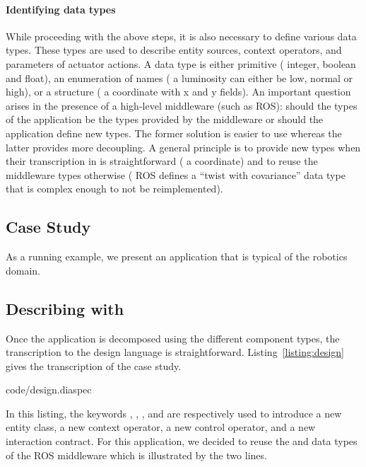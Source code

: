 \paragraph{Identifying data types}
While proceeding with the above steps, it is also necessary to define
various data types. These types are used to describe entity sources,
context operators, and parameters of actuator actions. A data type is
either primitive (\eg{} integer, boolean and float), an enumeration of
names (\eg{} a luminosity can either be low, normal or high), or a
structure (\eg{} a coordinate with x and y fields). An important
question arises in the presence of a high-level middleware
(such as ROS): should the types of the application be the types
provided by the middleware or should the application define
new types. The former solution is easier to use whereas the latter
provides more decoupling. A general principle is to provide new types
when their transcription in \diaspec{} is straightforward (\eg{} a
coordinate) and to reuse the middleware types otherwise (\eg{}
ROS defines a ``twist with covariance'' data type that is complex
enough to not be reimplemented).

\subsection{Case Study}

As a running example, we present an application that is typical of the
robotics domain.

\subsection{Describing with \diaspec{}}

Once the application is decomposed using the different component types,
the transcription to the \diaspec{} design language is
straightforward. Listing~\ref{listing:design} gives the transcription
of the case study.

%
{code/design.diaspec}

In this listing, the keywords , ,
, and  are respectively used to introduce
a new entity class, a new context operator, a new control operator,
and a new interaction contract. For this application, we decided to
reuse the  and  data types of the ROS middleware
which is illustrated by the two  lines.


